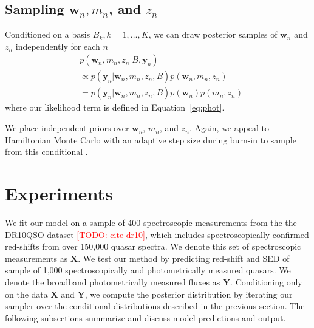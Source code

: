 \documentclass{article}
\newcommand{\red}[1]{\textcolor{red}{[TODO: #1]}}
\begin{document}
\subsection{Sampling $\mathbf{w}_n, m_n$, and $z_n$}
Conditioned on a basis $B_k, k=1,\dots, K$, we can draw posterior samples of $\mathbf{w}_n$ and $z_n$ independently for each $n$
\begin{align}
  &p(\mathbf{w}_n, m_n, z_n | B, \mathbf{y}_n) \\
  &\propto p(\mathbf{y}_n | \mathbf{w}_n, m_n, z_n, B) p(\mathbf{w}_n, m_n, z_n) \\
  &= p(\mathbf{y}_n | \mathbf{w}_n, m_n, z_n, B) p(\mathbf{w}_n) p(m_n, z_n)
\end{align}
where our likelihood term is defined in Equation~\ref{eq:phot}. 

We place independent priors over $\mathbf{w}_n$, $m_n$, and $z_n$.  Again, we appeal to Hamiltonian Monte Carlo with an adaptive step size during burn-in to sample from this conditional \cite{neal2011mcmc}. 

\section{Experiments}
\label{sec:experiments}
We fit our model on a sample of 400 spectroscopic measurements from the the DR10QSO dataset \red{cite dr10}, which includes spectroscopically confirmed red-shifts from over 150,000 quasar spectra.  
We denote this set of spectroscopic measurements  as $\mathbf{X}$. 
We test our method by predicting red-shift and SED of sample of 1,000 spectroscopically and photometrically measured quasars.  We denote the broadband photometrically measured fluxes as $\mathbf{Y}$.  
Conditioning only on the data $\mathbf{X}$ and $\mathbf{Y}$, we compute the posterior distribution by iterating our sampler over the conditional distributions described in the previous section.  
The following subsections summarize and discuss model predictions and output.  
\end{document}
